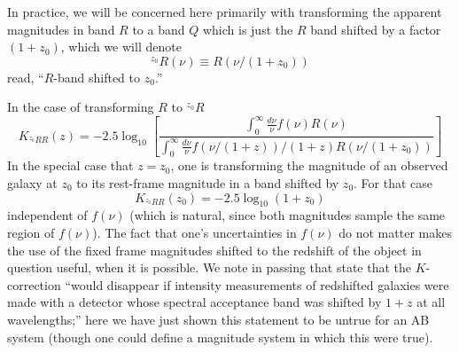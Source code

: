 \documentclass[10pt,preprint]{aastex}
\newcommand{\band}[2]{\ensuremath{^{{#1}}\!{#2}}}
\begin{document}
In practice, we will be concerned here primarily with transforming the
apparent magnitudes in band $R$ to a band $Q$ which is just the $R$
band shifted by a factor $(1+z_0)$, which we will denote
\begin{equation}
\band{z_0}{R}(\nu) \equiv R(\nu/(1+z_0))  
\end{equation}
read, ``$R$-band shifted to $z_0$.''  

In the case of transforming $R$ to $\band{z_0}{R}$
\begin{equation}
K_{\band{z_0}{R}R}(z) = -2.5 \log_{10} \left[
\frac{
\int_0^{\infty} \frac{d\nu}{\nu} f(\nu) R(\nu)
}{
\int_0^{\infty} \frac{d\nu}{\nu} f(\nu/(1+z))/(1+z) R(\nu/(1+z_0))
}
\right]
\end{equation}
In the special case that $z=z_0$, one is transforming the magnitude of
an observed galaxy at $z_0$ to its rest-frame magnitude in a band
shifted by $z_0$. For that case
\begin{equation}
K_{\band{z_0}{R}R}(z_0) = -2.5 \log_{10} (1+z_0)
\end{equation}
independent of $f(\nu)$ (which is natural, since both magnitudes
sample the same region of $f(\nu)$). The fact that one's uncertainties
in $f(\nu)$ do not matter makes the use of the fixed frame magnitudes
shifted to the redshift of the object in question useful, when it is
possible. We note in passing that \citet{oke68a} state that the
$K$-correction ``would disappear if intensity measurements of
redshifted galaxies were made with a detector whose spectral
acceptance band was shifted by $1+z$ at all wavelengths;'' here we
have just shown this statement to be untrue for an AB system (though
one could define a magnitude system in which this were true). 

\end{document}
